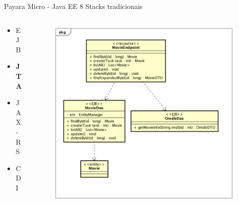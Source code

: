 \documentclass{beamer}
\begin{document}
\begin{frame}{Payara Micro - Java EE 8}
Stacks tradicionais
\begin{columns}[T] %
\begin{column}[T]{3cm} %
	\begin{itemize}
		\item EJB
		\item \textbf{JTA}
		\item JAX-RS
		\item CDI
	\end{itemize}
\end{column}
\begin{column}[T]{7cm} %
	\begin{figure}
		\centering
		\includegraphics[width=\linewidth]{Images/democlass}
	\end{figure}
\end{column}
\end{columns}
\end{frame}
\end{document}
